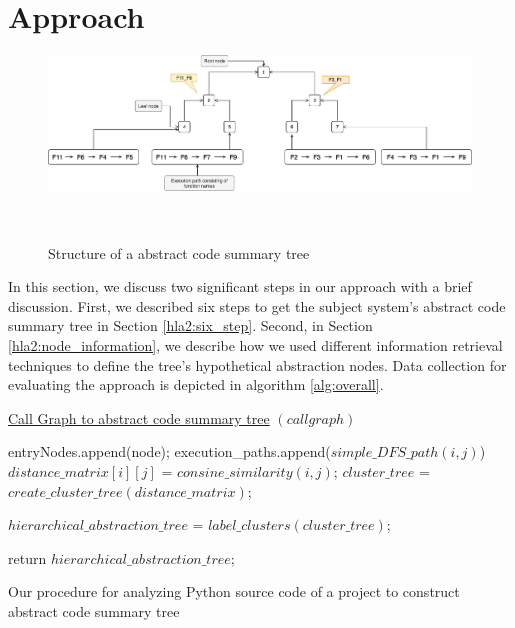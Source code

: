 \section{Approach}
\label{hla2:approach}
\begin{figure}[tb]
  \centering
  \includegraphics[width=\columnwidth]{figures/hla2/tree_structure.png}
  \caption{Structure of a abstract code summary tree}~\label{fig:tree_structure}
\end{figure}
In this section, we discuss two significant steps in our approach with a brief discussion. First, we described six steps to get the subject system's abstract code summary tree in Section \ref{hla2:six_step}. Second, in Section \ref{hla2:node_information}, we describe how we used different information retrieval techniques to define the tree's hypothetical abstraction nodes. Data collection for evaluating the approach is depicted in algorithm \ref{alg:overall}.


\begin{algorithm}
    
    \underline{Call Graph to abstract code summary tree} $(call graph)$\;
    
    {
        {
            entryNodes.append(node);
        }
    } 
    {
        {
            execution\_paths.append($simple\_DFS\_path(i, j)$)
        }
    }
    {
        {
            $distance\_matrix[i][j]$ = $consine\_similarity(i,j)$;
        }
    }
    $cluster\_tree$ = $create\_cluster\_tree(distance\_matrix)$;
    
    $hierarchical\_abstraction\_tree$ = $label\_clusters(cluster\_tree)$;
    
    return $hierarchical\_abstraction\_tree$;
    \caption{Our procedure for analyzing Python source code of a project to construct abstract code summary tree}
    \label{alg:overall}
\end{algorithm}

